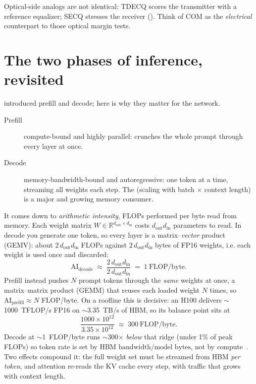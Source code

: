 Optical-side analogs are not identical: TDECQ scores the transmitter with a
reference equalizer; SECQ stresses the receiver (). Think of
COM as the \emph{electrical} counterpart to those optical margin tests.


\section{The two phases of inference, revisited}
\label{sec:inference-bottlenecks}

 introduced prefill and decode; here is why they matter for the
network.

\begin{description}
\item[Prefill] compute-bound and highly parallel: crunches the whole prompt
      through every layer at once.
\item[Decode] memory-bandwidth-bound and autoregressive: one token at a time,
      streaming all weights each step. The  (scaling with batch
      $\times$ context length) is a major and growing memory consumer.
\end{description}

 It comes down to
\emph{arithmetic intensity}, FLOPs performed per byte read from memory. Each
weight matrix $W\in\mathbb{R}^{d_\text{out}\times d_\text{in}}$ costs
$d_\text{out}d_\text{in}$ parameters to read. In decode you generate one token, so
every layer is a matrix--\emph{vector} product (GEMV): about $2\,d_\text{out}
d_\text{in}$ FLOPs against $2\,d_\text{out}d_\text{in}$ bytes of FP16 weights, i.e.
each weight is used once and discarded:
\[
\text{AI}_\text{decode}\;\approx\;
\frac{2\,d_\text{out}d_\text{in}}{2\,d_\text{out}d_\text{in}}
\;=\;1\ \text{FLOP/byte}.
\]
Prefill instead pushes $N$ prompt tokens through the \emph{same} weights at once, a
matrix--matrix product (GEMM) that reuses each loaded weight $N$ times, so
$\text{AI}_\text{prefill}\approx N$ FLOP/byte. On a roofline this is decisive: an
H100 delivers $\sim$1000~TFLOP/s FP16 on $\sim$3.35~TB/s of HBM, so its balance
point sits at
\[
\frac{1000\times10^{12}}{3.35\times10^{12}}\;\approx\;300\ \text{FLOP/byte}.
\]
Decode at $\sim$1~FLOP/byte runs $\sim$300$\times$ \emph{below} that ridge (under
1\% of peak FLOPs) so token rate is set by
$\text{HBM bandwidth}/\text{model bytes}$, not by compute~\cite{roofline}. Two
effects compound it: the full weight set must be streamed from HBM \emph{per token},
and attention re-reads the KV cache every step, with traffic that grows with context
length.

